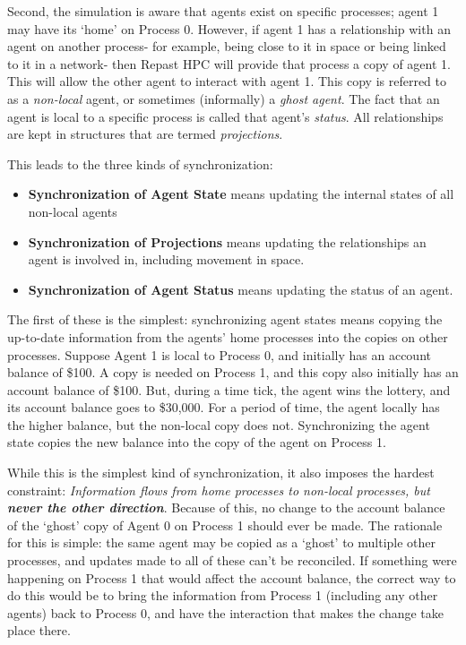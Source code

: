 Second, the simulation is aware that agents exist on specific processes; agent 1 may have its `home' on Process 0. However, if agent 1 has a relationship with an agent on another process- for example, being close to it in space or being linked to it in a network- then Repast HPC will provide that process a copy of agent 1. This will allow the other agent to interact with agent 1. This copy is referred to as a \textit{non-local} agent, or sometimes (informally) a \textit{ghost agent}. The fact that an agent is local to a specific process is called that agent's \textit{status}. All relationships are kept in structures that are termed \textit{projections}.

This leads to the three kinds of synchronization:

\begin{itemize}
\item \textbf{Synchronization of Agent State} means updating the internal states of all non-local agents
\item \textbf{Synchronization of Projections} means updating the relationships an agent is involved in, including movement in space.
\item \textbf{Synchronization of Agent Status} means updating the status of an agent.
\end{itemize}

The first of these is the simplest: synchronizing agent states means copying the up-to-date information from the agents' home processes into the copies on other processes. Suppose Agent 1 is local to Process 0, and initially has an account balance of \$100. A copy is needed on Process 1, and this copy also initially has an account balance of \$100. But, during a time tick, the agent wins the lottery, and its account balance goes to \$30,000. For a period of time, the agent locally has the higher balance, but the non-local copy does not. Synchronizing the agent state copies the new balance into the copy of the agent on Process 1.

While this is the simplest kind of synchronization, it also imposes the hardest constraint: \textit{Information flows from home processes to non-local processes, but \textbf{never the other direction}}. Because of this, no change to the account balance of the `ghost' copy of Agent 0 on Process 1 should ever be made. The rationale for this is simple: the same agent may be copied as a `ghost' to multiple other processes, and updates made to all of these can't be reconciled. If something were happening on Process 1 that would affect the account balance, the correct way to do this would be to bring the information from Process 1 (including any other agents) back to Process 0, and have the interaction that makes the change take place there.

